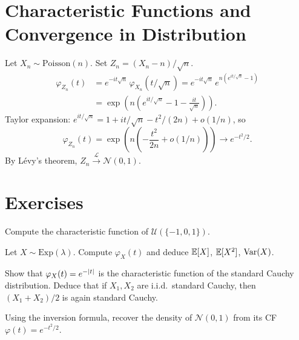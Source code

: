 \section{Characteristic Functions and Convergence in Distribution}

\begin{example}
Let $X_n \sim \mathrm{Poisson}(n)$. Set $Z_n = (X_n-n)/\sqrt{n}$.
\begin{align*}
    \varphi_{Z_n}(t) &= e^{-it\sqrt{n}}\,\varphi_{X_n}(t/\sqrt{n})
    = e^{-it\sqrt{n}}\,e^{n(e^{it/\sqrt{n}}-1)} \\
    &= \exp\!\left(n\!\left(e^{it/\sqrt{n}} - 1 - \frac{it}{\sqrt{n}}\right)\right).
\end{align*}
Taylor expansion: $e^{it/\sqrt{n}} = 1 + it/\sqrt{n} - t^2/(2n) + o(1/n)$, so
\[
    \varphi_{Z_n}(t) = \exp\!\left(n\!\left(-\frac{t^2}{2n}+o(1/n)\right)\right)
    \to e^{-t^2/2}.
\]
By L\'evy's theorem, $Z_n \xrightarrow{\mathcal{L}} \mathcal{N}(0,1)$.
\end{example}

\section{Exercises}

\begin{exercise}
Compute the characteristic function of $\mathcal{U}(\{-1, 0, 1\})$.
\end{exercise}

\begin{exercise}
Let $X \sim \mathrm{Exp}(\lambda)$. Compute $\varphi_X(t)$ and deduce
$\mathbb{E}[X]$, $\mathbb{E}[X^2]$, $\mathrm{Var}(X)$.
\end{exercise}

\begin{exercise}
Show that $\varphi_X(t) = e^{-\left| t \right|}$ is the characteristic function of the
standard Cauchy distribution. Deduce that if $X_1, X_2$ are i.i.d.\ standard
Cauchy, then $(X_1+X_2)/2$ is again standard Cauchy.
\end{exercise}

\begin{exercise}
Using the inversion formula, recover the density of $\mathcal{N}(0,1)$ from its
CF $\varphi(t) = e^{-t^2/2}$.
\end{exercise}

